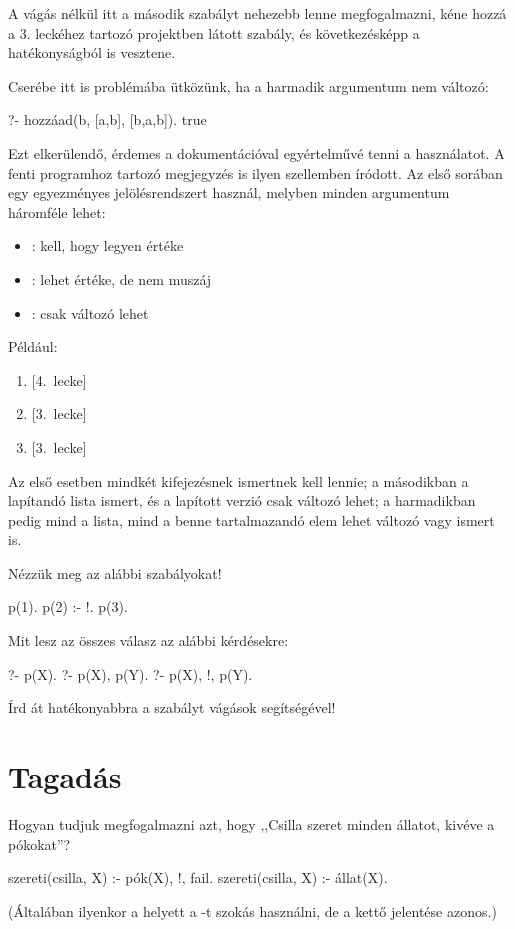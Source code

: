 A vágás nélkül itt a második szabályt nehezebb lenne
megfogalmazni, kéne hozzá a 3. leckéhez tartozó
projektben látott  szabály, és
következésképp a hatékonyságból is vesztene.

Cserébe itt is problémába ütközünk, ha a harmadik
argumentum nem változó:
\begin{query}
?- hozzáad(b, [a,b], [b,a,b]).
true
\end{query}
Ezt elkerülendő, érdemes a dokumentációval
egyértelművé tenni a használatot. A fenti programhoz
tartozó megjegyzés is ilyen szellemben íródott. Az
első sorában egy egyezményes jelölésrendszert
használ, melyben minden argumentum háromféle lehet:
\begin{itemize}
\item {} : kell, hogy legyen értéke
\item {} : lehet értéke, de nem muszáj
\item {} : csak változó lehet
\end{itemize}
Például:
\begin{enumerate}
\item {} [4.~lecke]
\item {} [3.~lecke]
\item {} [3.~lecke]
\end{enumerate}
Az első esetben mindkét kifejezésnek ismertnek kell
lennie; a másodikban a lapítandó lista ismert, és a
lapított verzió csak változó lehet; a harmadikban
pedig mind a lista, mind a benne tartalmazandó elem
lehet változó vagy ismert is.

\begin{problem}
Nézzük meg az alábbi szabályokat!
\begin{program}
p(1).
p(2) :- !.
p(3).
\end{program}       
Mit lesz az összes válasz az alábbi kérdésekre:
\begin{query}
?- p(X).
?- p(X), p(Y).
?- p(X), !, p(Y).
\end{query}
\end{problem}
\begin{problem}
Írd át hatékonyabbra a  szabályt
vágások segítségével!
\end{problem}

\section{Tagadás}
Hogyan tudjuk megfogalmazni azt, hogy ,,Csilla
szeret minden állatot, kivéve a pókokat''?
\begin{program}
szereti(csilla, X) :- pók(X), !, fail.
szereti(csilla, X) :- állat(X).
\end{program}
(Általában ilyenkor a  helyett a
-t szokás használni, de a kettő jelentése
azonos.)

